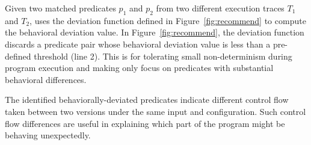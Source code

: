 
Given two matched predicates $p_{1}$ and $p_{2}$ from two different execution traces $T_{1}$ and $T_{2}$,
\ourtool uses the {deviation} function defined in Figure~\ref{fig:recommend}
to compute the behavioral deviation value.
In Figure~\ref{fig:recommend}, the {deviation} function
 discards a predicate pair whose behavioral deviation value is less than
a pre-defined threshold (line 2). This is for tolerating small non-determinism
during program execution and
making \ourtool only focus on predicates with substantial
behavioral differences.

The identified behaviorally-deviated predicates indicate different
control flow taken between two versions under the same input
and configuration. Such control flow differences are useful
in explaining %
which part of the program might be behaving unexpectedly. 





